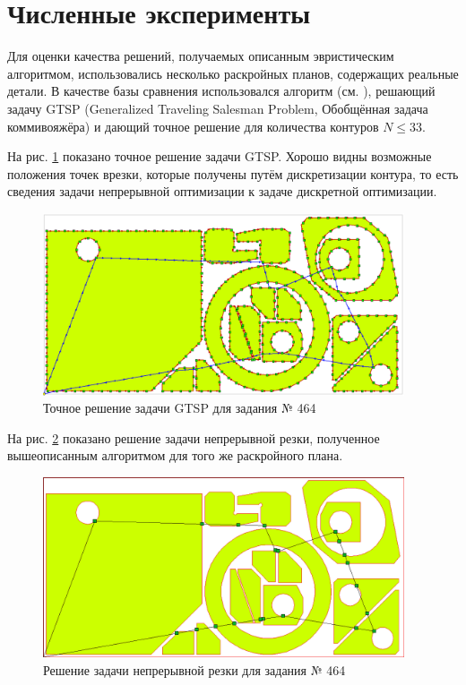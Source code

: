 \documentclass[14pt]{extarticle}
\theoremstyle{plain}%
\theoremstyle{remark}
\begin{document}
\section{Численные эксперименты}

Для оценки качества решений,
получаемых описанным
эвристическим алгоритмом,
использовались несколько раскройных планов,
содержащих реальные детали.
В качестве базы сравнения
использовался алгоритм
(см. \cite{bi15}),
решающий задачу GTSP
(Generalized Traveling Salesman Problem,
Обобщённая задача коммивояжёра)
и дающий точное решение для количества контуров
$N \leqslant 33$.

На рис. \ref{gtsp-path}
показано точное решение задачи GTSP.
Хорошо видны возможные положения точек врезки,
которые получены путём дискретизации контура,
то есть сведения задачи непрерывной оптимизации
к задаче дискретной оптимизации.

\begin{figure}
  \begin{center}
    \includegraphics[width=0.95\textwidth]{464-gtsp.png}
  \end{center}
  \caption{Точное решение задачи GTSP для задания № 464}
  \label{gtsp-path}
\end{figure}

На рис. \ref{ccp-path}
показано решение задачи непрерывной резки,
полученное вышеописанным алгоритмом
для того же раскройного плана.

\begin{figure}
  \begin{center}
    \includegraphics[width=0.95\textwidth]{464-ccp.png}
  \end{center}
  \caption{Решение задачи непрерывной резки для задания № 464}
  \label{ccp-path}
\end{figure}
\end{document}
